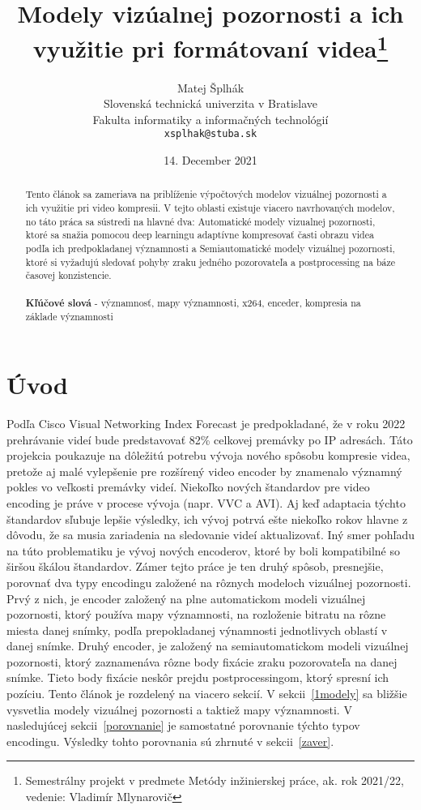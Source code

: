 \documentclass[10pt,twoside,slovak,a4paper]{article}
\title{Modely vizúalnej pozornosti a ich využitie pri formátovaní videa\thanks{Semestrálny projekt v predmete Metódy inžinierskej práce, ak. rok 2021/22, vedenie: Vladimír Mlynarovič}} %
\author{Matej Šplhák\\[2pt]
	{\small Slovenská technická univerzita v Bratislave}\\
	{\small Fakulta informatiky a informačných technológií}\\
	{\small \texttt{xsplhak@stuba.sk}}
	}
\date{\small 14. December 2021} %
\begin{document}
\maketitle
\begin{abstract}
Tento článok sa zameriava na priblíženie výpočtových modelov vizuálnej pozornosti a ich využitie pri video kompresii. V tejto oblasti existuje viacero navrhovaných modelov, no táto práca sa sústredi na hlavné dva: Automatické modely vizualnej pozornosti, ktoré sa snažia pomocou deep learningu adaptívne kompresovať časti obrazu videa podľa ich predpokladanej významnosti a Semiautomatické modely vizuálnej pozornosti, ktoré  si vyžadujú sledovať pohyby zraku jedného pozorovateľa a postprocessing na báze časovej konzistencie.\\ 
\\
\textbf{Kľúčové slová} - významnosť, mapy významnosti, x264, enceder, kompresia na základe významnosti
\end{abstract}


\section{Úvod}
Podľa Cisco  Visual  Networking  Index  Forecast\cite{cisco:forecast} je predpokladané, že v roku 2022 prehrávanie videí bude predstavovať 82\% celkovej premávky po IP adresách. Táto projekcia poukazuje na dôležitú potrebu vývoja nového spôsobu kompresie videa, pretože aj malé vylepšenie pre rozšírený video encoder by znamenalo významný pokles vo veľkosti premávky videí. Niekoľko nových štandardov pre video encoding je práve v procese vývoja (napr. VVC a AVI). Aj keď adaptacia týchto štandardov sľubuje lepšie výsledky, ich vývoj potrvá ešte niekoľko rokov hlavne z dôvodu, že sa musia zariadenia na sledovanie videí aktualizovať. Iný smer pohľadu na túto problematiku je vývoj nových encoderov, ktoré by boli kompatibilné so širšou škálou štandardov. Zámer tejto práce je ten druhý spôsob, presnejšie, porovnať dva typy encodingu založené na rôznych modeloch vizuálnej pozornosti. Prvý z nich\cite{Czarnecki:Progress}, je encoder založený na plne automatickom modeli vizuálnej pozornosti, ktorý používa mapy významnosti, na rozloženie bitratu na rôzne miesta danej snímky, podľa prepokladanej výnamnosti jednotlivych oblastí v danej snímke. Druhý encoder\cite{Coplien:MPD}, je založený na semiautomatickom modeli vizuálnej pozornosti, ktorý zaznamenáva rôzne body fixácie zraku pozorovateľa na danej snímke. Tieto body fixácie neskôr prejdu postprocessingom, ktorý spresní ich pozíciu. Tento článok je rozdelený na viacero sekcií. V sekcii~\ref{1modely} sa bližšie vysvetlia modely vizuálnej pozornosti a taktiež mapy významnosti. V nasledujúcej sekcii~\ref{porovnanie} je samostatné porovnanie týchto typov encodingu. Výsledky tohto porovnania sú zhrnuté v sekcii~\ref{zaver}.   
\end{document}
